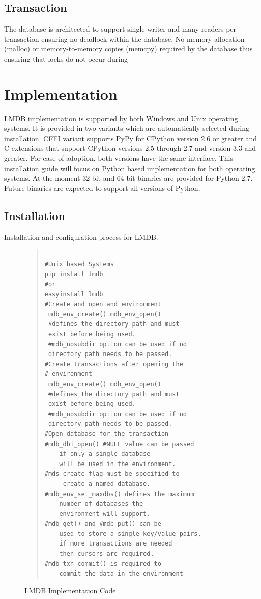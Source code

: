 \documentclass[9pt,twocolumn,twoside]{../../styles/osajnl}
\begin{document}
\subsection{Transaction}

The database is architected to support single-writer and many-readers
per transaction \cite{www-lmdbdoc} ensuring no deadlock within the
database. No memory allocation (malloc) or memory-to-memory copies
(memcpy) required by the database thus ensuring that locks do not
occur during

\section{Implementation}

LMDB implementation is supported by both Windows and Unix operating
systems. It is provided in two variants which are automatically
selected during installation. CFFI variant supports PyPy for CPython
version 2.6 or greater and C extensions that support CPython versions
2.5 through 2.7 and version 3.3 and greater. For ease of adoption,
both versions have the same interface. This installation guide will
focus on Python based implementation for both operating systems.  At
the moment 32-bit and 64-bit binaries are provided for Python
2.7. Future binaries are expected to support all versions of Python.

\subsection{Installation}

Installation and configuration process for LMDB.

\begin{figure}[htb]
\begin{quote}
\begin{Verbatim}

#Unix based Systems
pip install lmdb
#or
easyinstall lmdb
#Create and open and environment   
 mdb_env_create() mdb_env_open() 
 #defines the directory path and must
 exist before being used.  
 #mdb_nosubdir option can be used if no
 directory path needs to be passed. 
#Create transactions after opening the 
# environment
 mdb_env_create() mdb_env_open() 
 #defines the directory path and must
 exist before being used.  
 #mdb_nosubdir option can be used if no
 directory path needs to be passed. 
#Open database for the transaction
#mdb_dbi_open() #NULL value can be passed 
    if only a single database
    will be used in the environment. 
#mds_create flag must be specified to
     create a named database. 
#mdb_env_set_maxdbs() defines the maximum 
    number of databases the
    environment will support.
#mdb_get() and #mdb_put() can be 
    used to store a single key/value pairs,
    if more transactions are needed 
    then cursors are required. 
#mdb_txn_commit() is required to 
    commit the data in the environment

\end{Verbatim}
\end{quote}
\caption{LMDB Implementation Code}\label{alg:python}
\end{figure}
\end{document}

